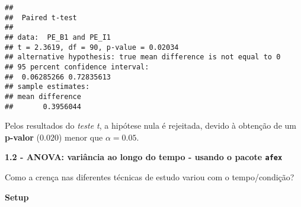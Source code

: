 \documentclass[
]{article}
\begin{document}
\begin{verbatim}
## 
##  Paired t-test
## 
## data:  PE_B1 and PE_I1
## t = 2.3619, df = 90, p-value = 0.02034
## alternative hypothesis: true mean difference is not equal to 0
## 95 percent confidence interval:
##  0.06285266 0.72835613
## sample estimates:
## mean difference 
##       0.3956044
\end{verbatim}

Pelos resultados do \emph{teste t}, a hipótese nula é rejeitada, devido
à obtenção de um \textbf{p-valor} (\(0.020\)) menor que
\(\alpha = 0.05\).

\textbf{1.2 - ANOVA: variância ao longo do tempo - usando o pacote
\texttt{afex}}

Como a crença nas diferentes técnicas de estudo variou com o
tempo/condição?

\textbf{Setup}
\end{document}
